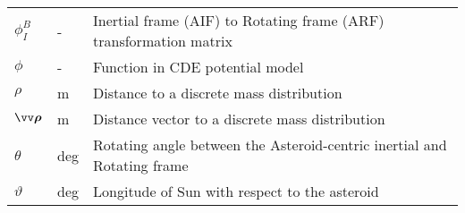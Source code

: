 \begin{longtable}[l]{p{100pt} p{70pt} p{150pt}}
    $\phi_{I}^{B}$      & -               & Inertial frame (AIF) to Rotating frame (ARF)
                                            transformation matrix                           \\
    $\phi$              & -               & Function in CDE potential model                 \\
    $\rho$              & m               & Distance to a discrete mass distribution        \\
    $\bvector{\rho}$    & m               & Distance vector to a discrete mass distribution \\
    $\theta$            & deg             & Rotating angle between the Asteroid-centric
                                            inertial and Rotating frame                     \\
    $\vartheta$         & deg             & Longitude of Sun with respect to the asteroid   \\
\end{longtable}
\vspace{1cm}

